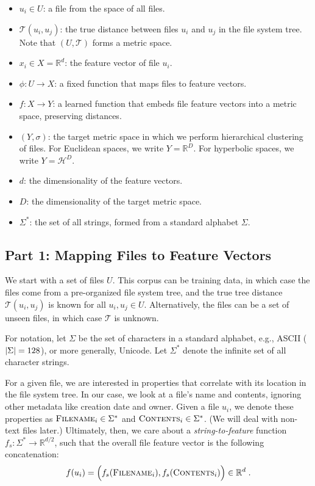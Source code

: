 \documentclass{article}
\begin{document}
\begin{itemize}
  \item $u_i \in U$: a file from the space of all files.
  \item $\mathcal T(u_i, u_j)$: the true distance between files $u_i$ and $u_j$ in the file system tree. Note that $(U, \mathcal T)$ forms a metric space.
  \item $x_i \in X = \mathbb{R}^d$: the feature vector of file $u_i$.
  \item $\phi: U \to X$: a fixed function that maps files to feature vectors.
  \item $f: X \to Y$: a learned function that embeds file feature vectors into a metric space, preserving distances.
  \item $(Y, \sigma)$: the target metric space in which we perform hierarchical clustering of files. For Euclidean spaces, we write $Y = \mathbb R^D$. For hyperbolic spaces, we write $Y = \mathcal H^D$.
  \item $d$: the dimensionality of the feature vectors.
  \item $D$: the dimensionality of the target metric space.
  \item $\Sigma^*$: the set of all strings, formed from a standard alphabet $\Sigma$.
\end{itemize}

\subsection{Part 1: Mapping Files to Feature Vectors}

We start with a set of files $U$. This corpus can be training data, in which case the files come from a pre-organized file system tree, and the true tree distance $\mathcal T(u_i, u_j)$ is known for all $u_i, u_j \in U$. Alternatively, the files can be a set of unseen files, in which case $\mathcal T$ is unknown.

For notation, let $\Sigma$ be the set of characters in a standard alphabet, e.g., ASCII ($\abs{\Sigma} = 128$), or more generally, Unicode. Let $\Sigma^*$ denote the infinite set of all character strings.

For a given file, we are interested in properties that correlate with its location in the file system tree. In our case, we look at a file's name and contents, ignoring other metadata like creation date and owner. Given a file $u_i$, we denote these properties as $\textsc{Filename}_i \in \Sigma^*$ and $\textsc{Contents}_i \in \Sigma^*$. (We will deal with non-text files later.) Ultimately, then, we care about a \emph{string-to-feature} function $f_s: \Sigma^* \to \mathbb R^{d/2}$, such that the overall file feature vector is the following concatenation:
\begin{align}
  f(u_i) =
  \Big( f_s(\textsc{Filename}_i), f_s(\textsc{Contents}_i) \Big) \in \mathbb R^d \; .
\end{align}
\end{document}
